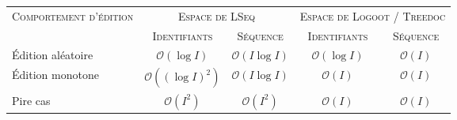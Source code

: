 
\begin{tabularx}{1\textwidth}{@{}Xcccc@{}}
  \toprule
  \textsc{Comportement d'édition} & \multicolumn{2}{c}{\textsc{Espace de LSeq}} & \multicolumn{2}{c}{\textsc{Espace de Logoot} / \textsc{Treedoc}} \\ \cmidrule{2-3} \cmidrule{4-5} 
                   & \textsc{Identifiants} & \textsc{Séquence} & \textsc{Identifiants} & \textsc{Séquence} \\ \midrule
  Édition aléatoire & $\mathcal{O}(\log I)$ & $\mathcal{O}(I\log I)$ & $\mathcal{O}(\log I)$ & $\mathcal{O}(I)$\\
  Édition monotone & $\mathcal{O}((\log I)^2)$ & $\mathcal{O}(I \log I)$ & $\mathcal{O}(I)$ & $\mathcal{O}(I)$ \\
  Pire cas & $\mathcal{O}(I^2)$ & $\mathcal{O}(I^2)$ & $\mathcal{O}(I)$ & $\mathcal{O}(I)$  \\ \bottomrule
\end{tabularx}
